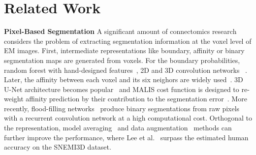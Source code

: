 
\section{Related Work}
\noindent\textbf{Pixel-Based Segmentation}
A significant amount of connectomics research considers the problem of extracting segmentation information at the voxel level of EM images.
First, intermediate representations like boundary, affinity or binary segmentation maps are generated from voxels.
For the boundary probabilities, random forest with hand-designed features~\cite{kaynig2015large}, 2D and 3D convolution networks ~\cite{bogovic2013learned,seymour2016rhoananet,ronneberger2015u,ciresan2012deep,jain2010boundary,amelio_segmentation}.
Later, the affinity between each voxel and its six neighors are widely used~\cite{lee2015recursive,parag2017anisotropic,cciccek20163d,turaga2010convolutional,lee2017superhuman}. 3D U-Net architecture becomes popular~\cite{cciccek20163d} and MALIS cost function is designed to re-weight affinity prediction by their contribution to the segmentation error~\cite{briggman2009maximin}.
More recently, flood-filling networks~\cite{januszewski2016flood} produce binary segmentations from raw pixels with a recurrent convolution network at a high computational cost.
Orthogonal to the representation, model averaging~\cite{zeng2017deepem3d} and data augmentation~\cite{lee2017superhuman} methods can further improve the performance, where Lee et al.~\cite{lee2017superhuman} surpass the estimated human accuracy on the SNEMI3D dataset.

